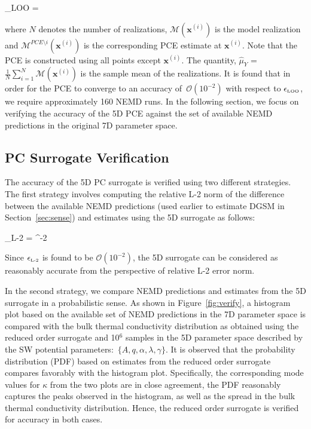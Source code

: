 \be
\epsilon_{\tiny{\mbox{LOO}}} = 
\label{eq:loo}
\ee 

\noindent where $N$ denotes the number of realizations, $\mathcal{M}(\bm{x}^{(i)})$ is the
model realization and $\mathcal{M}^{PCE\setminus i}(\bm{x}^{(i)})$ is the corresponding PCE estimate
at $\bm{x}^{(i)}$. Note that the PCE is constructed using all points except $\bm{x}^{(i)}$.
The quantity, $\hat{\mu}_Y$ = $\frac{1}{N}\sum\limits_{i=1}^{N}\mathcal{M}(\bm{x}^{(i)})$
is the sample mean of the realizations. 
It is found that in order for the PCE to converge to an accuracy of~$\mathcal{O}(10^{-2})$
with respect to $\epsilon_{\tiny{\mbox{LOO}}}$, we require approximately 160 NEMD runs. In the
following section, we focus on verifying the accuracy of the 5D PCE against the set of available
NEMD predictions in the original 7D parameter space. 

\subsection{PC Surrogate Verification}

The accuracy of the 5D PC surrogate is verified using two different strategies. The first strategy involves
computing the relative L-2 norm of the difference between the available NEMD predictions (used earlier
to estimate DGSM in Section~\ref{sec:sense}) and estimates using the 5D surrogate as follows:

\be
\epsilon_{\mbox{\tiny{L-2}}} = 
 ^{-2}
\ee
 
\noindent Since $\epsilon_{\mbox{\tiny{L-2}}}$ is found to be $\mathcal{O}(10^{-2})$, the 5D surrogate can be considered as
reasonably accurate from the perspective of relative L-2 error norm. 

In the second strategy, we compare NEMD
predictions and estimates from the 5D surrogate in a probabilistic sense. As shown in Figure~\ref{fig:verify}, a 
histogram plot based on the available set of NEMD predictions in the 7D parameter space is compared with
the bulk thermal conductivity distribution as obtained using the reduced order surrogate and 10$^6$ samples in the
5D parameter space described by the SW potential parameters:~$\{A,q,\alpha,\lambda,\gamma\}$. It is
observed that the probability distribution (PDF) based on estimates from the reduced order surrogate compares
favorably with the histogram plot. Specifically, the corresponding mode values for $\kappa$ from the two plots are
in close agreement, the PDF reasonably captures the peaks observed in the histogram, as well as the spread in
the bulk thermal conductivity distribution. 
Hence, the reduced order surrogate is verified for accuracy in both cases. 
\bigskip

